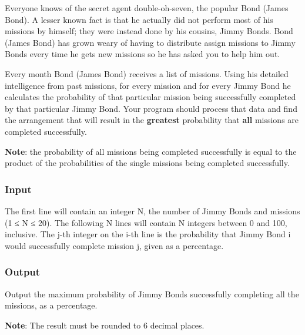 

Everyone knows of the secret agent double-oh-seven, the popular Bond (James Bond). A lesser known fact is that he actually did not perform most of his missions by himself; they were instead done by his cousins, Jimmy Bonds. Bond (James Bond) has grown weary of having to distribute assign missions to Jimmy Bonds every time he gets new missions so he has asked you to help him out.

Every month Bond (James Bond) receives a list of missions. Using his detailed intelligence from past missions, for every mission and for every Jimmy Bond he calculates the probability of that particular mission being successfully completed by that particular Jimmy Bond. Your program should process that data and find the arrangement that will result in the \textbf{greatest }probability that \textbf{all }missions are completed successfully.

\textbf{Note}: the probability of all missions being completed successfully is equal to the product of the probabilities of the single missions being completed successfully. 

\subsubsection{Input}

The first line will contain an integer N, the number of Jimmy Bonds and missions (1 ≤ N ≤ 20). The following N lines will contain N integers between 0 and 100, inclusive. The j-th integer on the i-th line is the probability that Jimmy Bond i would successfully complete mission j, given as a percentage.

\subsubsection{Output}

Output the maximum probability of Jimmy Bonds successfully completing all the missions, as a percentage.

\textbf{Note}: The result must be rounded to 6 decimal places.

